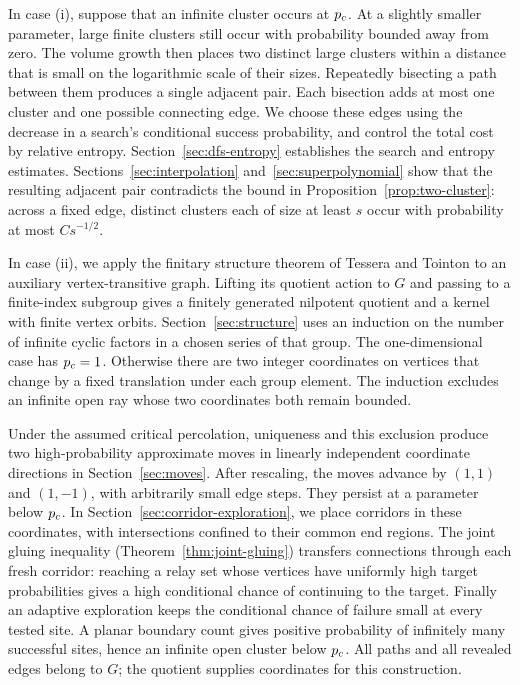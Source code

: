 In case (i), suppose that an infinite cluster occurs at $p_c$.
At a slightly smaller parameter, large finite clusters still occur
with probability bounded away from zero. The volume growth then
places two distinct large clusters within a distance that is small
on the logarithmic scale of their sizes. Repeatedly bisecting a
path between them produces a single adjacent pair. Each bisection
adds at most one cluster and one possible connecting edge. We choose these
edges using the decrease in a search's conditional success
probability, and control the total cost by relative entropy.
Section~\ref{sec:dfs-entropy} establishes the search and entropy
estimates. Sections~\ref{sec:interpolation} and~\ref{sec:superpolynomial} show
that the resulting adjacent pair contradicts the bound in
Proposition~\ref{prop:two-cluster}: across a fixed edge, distinct
clusters each of size at least $s$ occur with probability at most
$Cs^{-1/2}$.

In case (ii), we apply the finitary structure theorem of Tessera and
Tointon \cite[Corollary~2.4]{TesseraTointon2021} to an auxiliary
vertex-transitive graph. Lifting its quotient action to $G$ and
passing to a finite-index subgroup gives a finitely generated
nilpotent quotient and a kernel with finite vertex orbits.
Section~\ref{sec:structure} uses an
induction on the number of infinite cyclic factors in a chosen
series of that group. The one-dimensional case has $p_c=1$.
Otherwise there are two integer coordinates on vertices that change
by a fixed translation under each group element. The induction excludes an infinite open ray whose
two coordinates both remain bounded.

Under the assumed critical percolation, uniqueness and this exclusion
produce two high-probability approximate moves in linearly independent
coordinate directions in Section~\ref{sec:moves}. After rescaling, the moves advance by
$(1,1)$ and $(1,-1)$, with arbitrarily small edge steps.
They persist at a parameter below $p_c$. In
Section~\ref{sec:corridor-exploration}, we place corridors in
these coordinates, with intersections confined to their common
end regions. The joint gluing inequality
(Theorem~\ref{thm:joint-gluing}) transfers connections through each
fresh corridor: reaching a relay set whose vertices have uniformly
high target probabilities gives a high conditional chance of continuing
to the target. Finally an adaptive exploration keeps the
conditional chance of failure small at every tested site. A planar
boundary count gives positive probability of infinitely many
successful sites, hence an infinite open cluster below $p_c$.
All paths and all revealed edges belong to $G$; the quotient supplies
coordinates for this construction.


